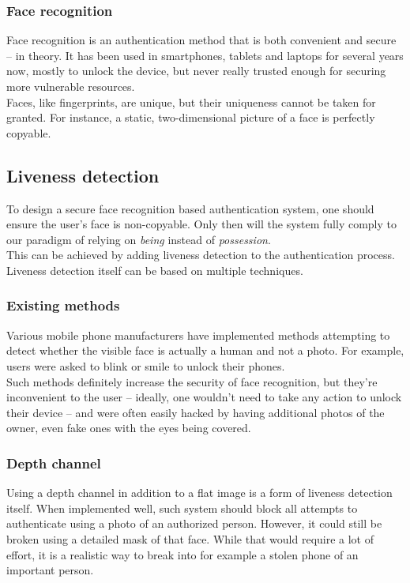         \subsubsection*{Face recognition}
            Face recognition is an authentication method that is both convenient
            and secure -- in theory. It has been used in smartphones, tablets
            and laptops for several years now, mostly to unlock the device, but
            never really trusted enough for securing more vulnerable resources.\\
            Faces, like fingerprints, are unique, but their uniqueness cannot be
            taken for granted. For instance, a static, two-dimensional picture of
            a face is perfectly copyable.

    \subsection{Liveness detection}
        To design a secure face recognition based authentication system,
        one should ensure the user's face is non-copyable. Only then will the
        system fully comply to our paradigm of relying on \textit{being} instead
        of \textit{possession}.\\
        This can be achieved by adding liveness detection to the authentication
        process. Liveness detection itself can be based on multiple techniques.

        \subsubsection*{Existing methods}
            Various mobile phone manufacturers have implemented methods attempting to
            detect whether the visible face is actually a human and not a photo.
            For example, users were asked to blink or smile to unlock their phones.\\
            Such methods definitely increase the security of face recognition,
            but they're inconvenient to the user -- ideally, one wouldn't need to take
            any action to unlock their device -- and were often easily hacked by having
            additional photos of the owner, even fake ones with the eyes being covered.

        \subsubsection*{Depth channel}
            Using a depth channel in addition to a flat image is a form of liveness
            detection itself.
            When implemented well, such system should block all attempts to authenticate
            using a photo of an authorized person.
            However, it could still be broken using a detailed mask of that face.
            While that would require a lot of effort, it is a realistic way to break
            into for example a stolen phone of an important person.


